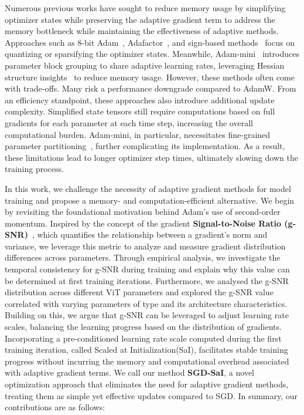 Numerous previous works have sought to reduce memory usage by simplifying optimizer states while preserving the adaptive gradient term to address the memory bottleneck while maintaining the effectiveness of adaptive methods. Approaches such as 8-bit Adam~\cite{DBLP:journals/corr/abs-2110-02861}, Adafactor~\cite{shazeer2018adafactor}, and sign-based methods~\cite{bernstein2018signsgdcompressedoptimisationnonconvex, kunstner2023noise} focus on quantizing or sparsifying the optimizer states. Meanwhile, Adam-mini~\cite{zhang2024adamminiusefewerlearning} introduces parameter block grouping to share adaptive learning rates, leveraging Hessian structure insights~\cite{zhang2024transformers} to reduce memory usage. However, these methods often come with trade-offs. Many risk a performance downgrade compared to AdamW. From an efficiency standpoint, these approaches also introduce additional update complexity. Simplified state tensors still require computations based on full gradients for each parameter at each time step, increasing the overall computational burden. Adam-mini, in particular, necessitates fine-grained parameter partitioning~\cite{zhang2024adamminiusefewerlearning}, further complicating its implementation. As a result, these limitations lead to longer optimizer step times, ultimately slowing down the training process.

In this work, we challenge the necessity of adaptive gradient methods for model training and propose a memory- and computation-efficient alternative. We begin by revisiting the foundational motivation behind Adam's use of second-order momentum. Inspired by the concept of the gradient \textbf{Signal-to-Noise Ratio (g-SNR)}~\cite{xiang2023exploiting}, which quantifies the relationship between a gradient's norm and variance, we leverage this metric to analyze and measure gradient distribution differences across parameters. Through empirical analysis, we investigate the temporal consistency for g-SNR during training and explain why this value can be determined at first training iterations. Furthermore, we analysed the g-SNR distribution across different ViT parameters and explored the g-SNR value correlated with varying parameters of type and its architecture characteristics. Building on this, we argue that g-SNR can be leveraged to adjust learning rate scales, balancing the learning progress based on the distribution of gradients. Incorporating a pre-conditioned learning rate scale computed during the first training iteration, called Scaled at Initialization(SaI), facilitates stable training progress without incurring the memory and computational overhead associated with adaptive gradient terms. We call our method \textbf{SGD-SaI}, a novel optimization approach that eliminates the need for adaptive gradient methods, treating them as simple yet effective updates compared to SGD. In summary, our contributions are as follows:

